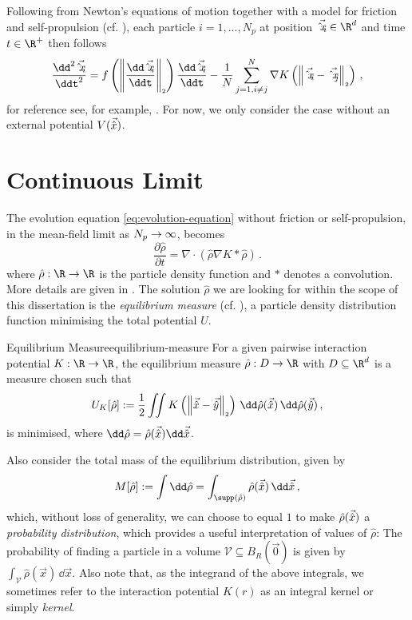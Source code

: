 Following from Newton's equations of motion together with a model for friction and self-propulsion (cf. ), each particle $i=1, ..., N_p$ at position $\vec{\hat{x}_i} \in \R^d$ and time $t \in \R^+$ then follows
\begin{equation}
  \frac{\dd^2 \vec{\hat{x}_i}}{\ddt^2} = f\left(\norm{\frac{\dd \vec{\hat{x}_i}}{\ddt}}\right) \frac{\dd\vec{\hat{x}_i}}{\ddt} - \frac{1}{N} \sum_{j=1, i\neq j}^{N} \nabla K\left(\norm{\vec{\hat{x}_i} - \vec{\hat{x}_j}}\right)\,,
  \label{eq:evolution-equation}
\end{equation}
for reference see, for example, \cite{2020-power-law-kernels, 2021-arbitrary-dimensions, 2017-explicit-solutions}.
For now, we only consider the case without an external potential $V(\vec{\hat{x}})$.

\section{Continuous Limit}
The evolution equation \eqref{eq:evolution-equation} without friction or self-propulsion, in the mean-field limit as $N_p \rightarrow \infty$, becomes
\begin{equation}
  \frac{\partial \hat{\rho}}{\partial t} = \nabla \cdot \left(\hat{\rho} \nabla K * \hat{\rho}\right)\,.
  \label{eq:continuous-evolution-equation}
\end{equation}
where $\hat{\rho}: \R \to \R$ is the particle density function and $*$ denotes a convolution.
More details are given in \cite{2014-carrillo-derivation-of-mean-field, 2021-carrillo-radial}.
The solution $\hat{\rho}$ we are looking for within the scope of this dissertation is the \textit{equilibrium measure} (cf. ), a particle density distribution function minimising the total potential $U$.

\begin{definition}{Equilibrium Measure}{equilibrium-measure}
  For a given pairwise interaction potential $K: \R \to \R$, the equilibrium measure $\hat{\rho}: D \to \R$ with $D \subseteq \R^d$ is a measure chosen such that
  $$U_K[\hat{\rho}] := \frac{1}{2} \iint K\left(\norm{\hatvec{x} - \hatvec{y}}\right) \,\dd\hat{\rho}(\hatvec{x})\,\dd\hat{\rho}(\hatvec{y})\,,$$
  is minimised, where $\dd\hat{\rho} = \hat{\rho}(\hatvec{x})\dd\hatvec{x}$.
\end{definition}
Also consider the total mass of the equilibrium distribution, given by
\begin{equation}
  M[\hat{\rho}] := \int \dd\hat{\rho} = \int_{\supp(\hat{\rho})} \hat{\rho}(\hatvec{x}) \,\dd\hatvec{x}\,,
  \label{eq:measure-mass}
\end{equation}
which, without loss of generality, we can choose to equal $1$ to make $\hat{\rho}(\vec{\hat{x}})$ a \textit{probability distribution}, which provides a useful interpretation of values of $\hat{\rho}$:
The probability of finding a particle in a volume $\mathcal{V} \subseteq B_R(\vec{0})$ is given by $\int_{\mathcal{V}} \hat{\rho}(\vec{x}) \,\dd\vec{x}$.
Also note that, as the integrand of the above integrals, we sometimes refer to the interaction potential $K(r)$ as an integral kernel or simply \textit{kernel}.

